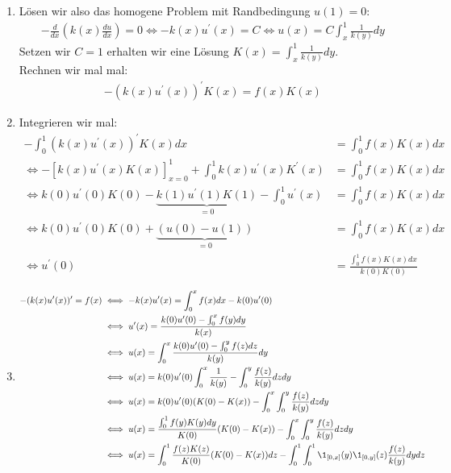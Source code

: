 \begin{solution}

\phantom{}
\begin{enumerate}[label = (\roman*)]
  \item Lösen wir also das homogene Problem mit Randbedingung $u(1) = 0$:
  \begin{align*}
    -\frac{d}{dx}\left(k(x)\frac{du}{dx}\right) = 0
    \iff -k(x)u^{\prime}(x) = C
    \iff u(x) = C\int_x^1 \frac{1}{k(y)} dy
  \end{align*}
  Setzen wir $C = 1$ erhalten wir eine Lösung $K(x) = \int_x^1 \frac{1}{k(y)}dy$. \\
  Rechnen wir mal mal:
  \begin{align*}
    -(k(x)u^{\prime}(x))^{\prime}K(x) = f(x)K(x)
  \end{align*}
  \item
  Integrieren wir mal:
  \begin{align*}
    -\int_0^1(k(x)u^{\prime}(x))^{\prime}K(x)dx
    &= \int_0^1f(x)K(x)dx \\
    \iff -[k(x)u^{\prime}(x)K(x)]_{x=0}^1 + \int_0^1k(x)u^{\prime}(x)K^{\prime}(x)
    &= \int_0^1f(x)K(x)dx \\
    \iff k(0)u^{\prime}(0)K(0) - \underbrace{k(1)u^{\prime}(1)K(1)}_{=0} - \int_0^1u^{\prime}(x)
    &= \int_0^1f(x)K(x)dx \\
    \iff k(0)u^{\prime}(0)K(0) + \underbrace{(u(0) - u(1))}_{=0}
    &= \int_0^1f(x)K(x)dx \\
    \iff u^{\prime}(0) &= \frac{\int_0^1f(x)K(x)dx}{k(0)K(0)}
  \end{align*}
  \item
  \begin{align*}
    -(k(x)u^{\prime}(x))^{\prime} = f(x) &\iff -k(x)u^{\prime}(x) = \int_{0}^xf(x)dx - k(0)u^{\prime}(0)  \\
    &\iff u^{\prime}(x)
    = \frac{k(0)u^{\prime}(0) - \int_0^x f(y)dy}{k(x)} \\
    &\iff u(x) = \int_0^x \frac{k(0)u^{\prime}(0) - \int_0^y f(z) dz}{k(y)}dy \\
    &\iff u(x) =  k(0)u^{\prime}(0)\int_0^x \frac{1}{k(y)} - \int_0^y \frac{f(z)}{k(y)} dz dy \\
    &\iff u(x) =  k(0)u^{\prime}(0)(K(0) - K(x)) - \int_0^x\int_0^y \frac{f(z)}{k(y)} dz dy \\
    &\iff u(x) =  \frac{\int_0^1f(y)K(y)dy}{K(0)}(K(0) - K(x)) - \int_0^x\int_0^y \frac{f(z)}{k(y)} dz dy \\
    &\iff u(x) = \int_0^1\frac{f(z)K(z)}{K(0)}(K(0) - K(x))dz - \int_0^1\int_0^1\1_{[0,x]}(y) \1_{[0,y]}(z) \frac{f(z)}{k(y)}dy dz\\

\end{align*}
\end{enumerate}
\end{solution}
